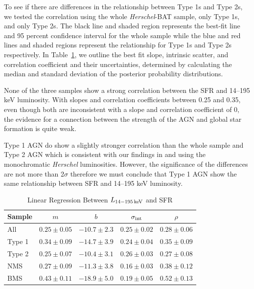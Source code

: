 \documentclass[fleqn, usenatbib]{mnras}
\newcommand{\herschel}{\emph{Herschel}}
\begin{document}
To see if there are differences in the relationship between Type 1s and Type 2s, we tested the correlation using the whole \herschel-BAT sample, only Type 1s, and only Type 2s. The black line and shaded region represents the best-fit line and 95 percent confidence interval for the whole sample while the blue and red lines and shaded regions represent the relationship for Type 1s and Type 2s respectively. In Table~\ref{tab:lbat_sfr_correlation}, we outline the best fit slope, intrinsic scatter, and correlation coefficient and their uncertainties, determined by calculating the median and standard deviation of the posterior probability distributions. 

None of the three samples show a strong correlation between the SFR and 14--195 keV luminosity. With slopes and correlation coefficients between 0.25 and 0.35, even though both are inconsistent with a slope and correlation coefficient of 0, the evidence for a connection between the strength of the AGN and global star formation is quite weak. 

Type 1 AGN do show a slightly stronger correlation than the whole sample and Type 2 AGN which is consistent with our findings in \citet{Melendez:2014yu} and \citet{Shimizu:2016qy} using the monochromatic \herschel{} luminosities. However, the significance of the differences are not more than 2$\sigma$ therefore we must conclude that Type 1 AGN show the same relationship between SFR and 14--195 keV luminosity.

\begin{table}
\begin{threeparttable}
\captionsetup{font=small,labelfont=bf,labelsep=period}
\caption{Linear Regression Between $L_{\rm14-195\,keV}$ and SFR \label{tab:lbat_sfr_correlation}}
\begin{tabular}{lcccc}
\toprule 
 Sample & $m$ & $b$  & $\sigma_{\rm int}$ & $\rho$  \\
\midrule
All        & $0.25\pm0.05$ & $-10.7\pm2.3$ & $0.25\pm0.02$ & $0.28\pm0.06$ \\
Type 1 &  $0.34\pm0.09$ & $-14.7\pm3.9$ & $0.24\pm0.04$ & $0.35\pm0.09$ \\ 
Type 2 &  $0.25\pm0.07$ & $-10.4\pm3.1$ & $0.26\pm0.03$ & $0.27\pm0.08$ \\
NMS      & $0.27\pm0.09$ & $-11.3\pm3.8$ & $0.16\pm0.03$ & $0.38\pm0.12$\\
BMS   & $0.43\pm0.11$ & $-18.9\pm5.0$ & $0.19\pm0.05$ & $0.52\pm0.13$ \\
\bottomrule
\end{tabular}
\end{threeparttable}
\end{table}
\end{document}
